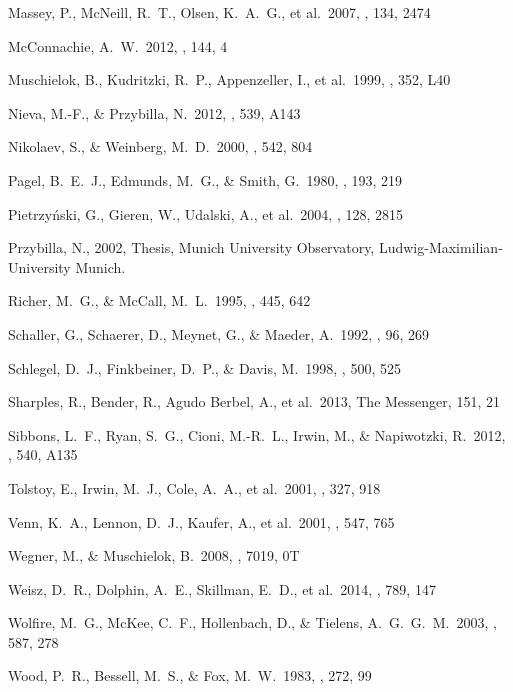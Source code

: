 \documentclass[iop]{emulateapj}
\begin{document}
\begin{thebibliography}{}
 Massey, P., McNeill,
R.~T., Olsen, K.~A.~G., et al.\ 2007, \aj, 134, 2474

 McConnachie, A.~W.\ 2012,
\aj, 144, 4

 Muschielok, B., Kudritzki, R.~P., Appenzeller, I., et al.\ 1999, \aap, 352, L40

 Nieva, M.-F., \& Przybilla, N.\ 2012, \aap, 539, A143

 Nikolaev, S., \& Weinberg, M.~D.\ 2000, \apj, 542, 804

 Pagel, B.~E.~J., Edmunds,
M.~G., \& Smith, G.\ 1980, \mnras, 193, 219

Pietrzy{\'n}ski, G., Gieren, W., Udalski, A., et al.\ 2004, \aj, 128, 2815

 Przybilla, N., 2002, Thesis, Munich University
Observatory, Ludwig-Maximilian-University Munich.

 Richer, M.~G., \& McCall, M.~L.\ 1995, \apj, 445, 642

 Schaller, G., Schaerer, D., Meynet, G., \& Maeder, A.\ 1992, \aaps, 96, 269

 Schlegel, D.~J.,
Finkbeiner, D.~P., \& Davis, M.\ 1998, \apj, 500, 525

 Sharples, R., Bender,
R., Agudo Berbel, A., et al.\ 2013, The Messenger, 151, 21

 Sibbons, L.~F., Ryan, S.~G., Cioni, M.-R.~L., Irwin, M., \& Napiwotzki, R.\ 2012, \aap, 540, A135


 Tolstoy, E., Irwin,
M.~J., Cole, A.~A., et al.\ 2001, \mnras, 327, 918

 Venn, K.~A., Lennon,
D.~J., Kaufer, A., et al.\ 2001, \apj, 547, 765

 Wegner, M., \& Muschielok, B.\ 2008, \procspie, 7019, 0T

 Weisz, D.~R., Dolphin,
A.~E., Skillman, E.~D., et al.\ 2014, \apj, 789, 147

 Wolfire, M.~G., McKee,
C.~F., Hollenbach, D., \& Tielens, A.~G.~G.~M.\ 2003, \apj, 587, 278

 Wood, P.~R., Bessell,
M.~S., \& Fox, M.~W.\ 1983, \apj, 272, 99

\end{thebibliography}



\end{document}
